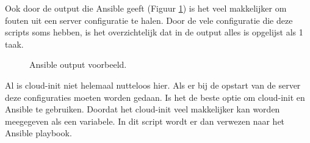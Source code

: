 Ook door de output die Ansible geeft (Figuur \ref{fig:Ansibleoutput}) is het veel makkelijker om fouten uit een server configuratie te halen. Door de vele configuratie die deze scripts soms hebben, is het overzichtelijk dat in de output alles is opgelijst als 1 taak.
\begin{figure}[!htb]
    \caption{Ansible output voorbeeld.}
    \label{fig:Ansibleoutput}
\end{figure}

Al is cloud-init niet helemaal nutteloos hier. Als er bij de opstart van de server deze configuraties moeten worden gedaan. Is het de beste optie om cloud-init en Ansible te gebruiken. Doordat het cloud-init veel makkelijker kan worden meegegeven als een variabele. In dit script wordt er dan verwezen naar het Ansible playbook.
